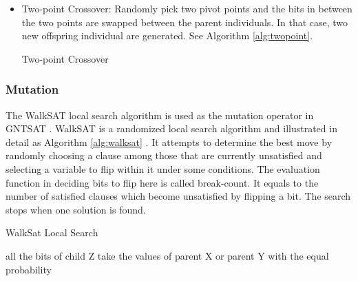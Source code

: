 \begin{itemize}
	\item
	      Two-point Crossover: Randomly pick two pivot points and the bits in between
	      the two points are swapped between the parent individuals. In that case, two
	      new offspring individual are generated. See Algorithm \ref{alg:twopoint}.

	      \begin{algorithm}[t]
		      \SetAlgoLined
		      \caption{Two-point Crossover}
		      \label{alg:twopoint}
		      \BlankLine
	      \end{algorithm}
\end{itemize}

\subsubsection{Mutation}
The WalkSAT local search algorithm is used as the mutation operator in GNTSAT
. WalkSAT is a randomized local search algorithm and illustrated in detail as
Algorithm \ref{alg:walksat} \parencite{biere2009handbook}. It attempts to
determine the best move by randomly choosing a clause among those that are
currently unsatisfied and selecting a variable to flip within it under some
conditions. The evaluation function in deciding bits to flip here is called
break-count. It equals to the number of satisfied clauses which become
unsatisfied by flipping a bit. The search stops when one solution is found.

\begin{algorithm*}[t]
	\SetAlgoLined
	\caption{WalkSat Local Search}
	\label{alg:walksat}
	\BlankLine
	all the bits of child Z take the values of parent X or parent Y with the equal
	probability\; 
\end{algorithm*}

